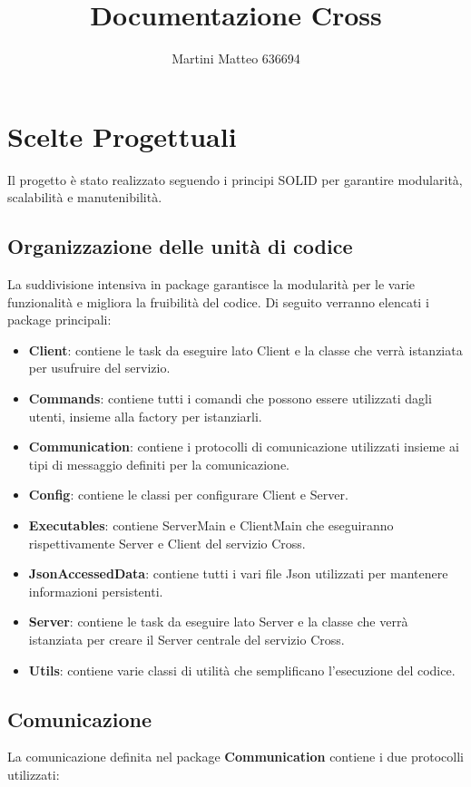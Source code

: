 \documentclass{article}
\title{Documentazione Cross}
\author{Martini Matteo 636694}
\begin{document}
\maketitle

\tableofcontents
\newpage

\section{Scelte Progettuali}
Il progetto è stato realizzato seguendo i principi SOLID per garantire modularità, scalabilità e manutenibilità.
\subsection{Organizzazione delle unità di codice}
La suddivisione intensiva in package garantisce la modularità per le varie funzionalità e migliora la fruibilità del codice.
Di seguito verranno elencati i package principali:
\begin{itemize}
    \item \textbf{Client}: contiene le task da eseguire lato Client e la classe che verrà istanziata per usufruire del servizio.
    \item \textbf{Commands}: contiene tutti i comandi che possono essere utilizzati dagli utenti, insieme alla factory per istanziarli.
    \item \textbf{Communication}: contiene i protocolli di comunicazione utilizzati insieme ai tipi di messaggio definiti per la comunicazione.
    \item \textbf{Config}: contiene le classi per configurare Client e Server.
    \item \textbf{Executables}: contiene ServerMain e ClientMain che eseguiranno rispettivamente Server e Client del servizio Cross.
    \item \textbf{JsonAccessedData}: contiene tutti i vari file Json utilizzati per mantenere informazioni persistenti.
    \item \textbf{Server}: contiene le task da eseguire lato Server e la classe che verrà istanziata per creare il Server centrale del servizio Cross.
    \item \textbf{Utils}: contiene varie classi di utilità che semplificano l'esecuzione del codice.
\end{itemize}

\subsection{Comunicazione}
La comunicazione definita nel package \textbf{Communication} contiene i due protocolli utilizzati:
\end{document}
